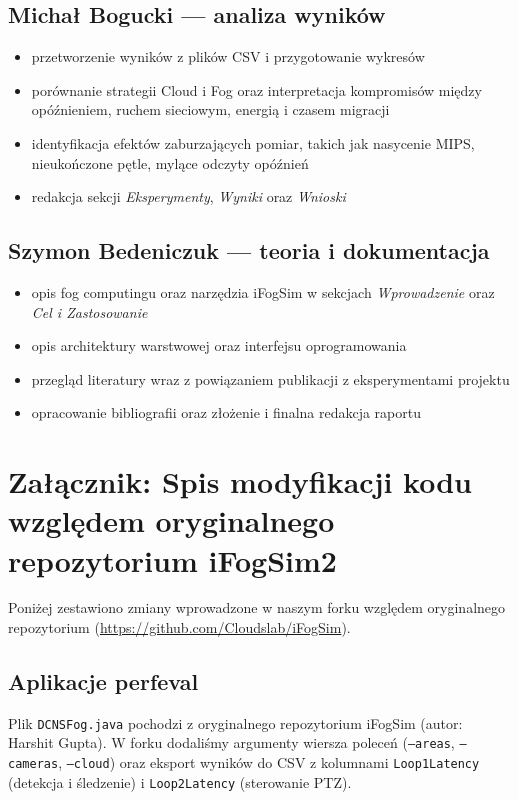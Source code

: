 \documentclass[
    oneside,            %
    left=2.5cm,         %
    right=2.5cm,        %
    top=2.5cm,          %
    bottom=3cm,         %
    bindingoffset=6mm,  %
    nohyphenation=false %
]{eiti/eiti-report}
\begin{document}
\subsection*{Michał Bogucki --- analiza wyników}
\begin{itemize}[noitemsep,topsep=2pt]
    \item przetworzenie wyników z plików CSV i przygotowanie wykresów
    \item porównanie strategii Cloud i Fog oraz interpretacja kompromisów między opóźnieniem, ruchem sieciowym, energią i czasem migracji
    \item identyfikacja efektów zaburzających pomiar, takich jak nasycenie MIPS, nieukończone pętle, mylące odczyty opóźnień
    \item redakcja sekcji \emph{Eksperymenty}, \emph{Wyniki} oraz \emph{Wnioski}
\end{itemize}

\subsection*{Szymon Bedeniczuk --- teoria i dokumentacja}
\begin{itemize}[noitemsep,topsep=2pt]
    \item opis fog computingu oraz narzędzia iFogSim w sekcjach \emph{Wprowadzenie} oraz \emph{Cel i Zastosowanie}
    \item opis architektury warstwowej oraz interfejsu oprogramowania
    \item przegląd literatury wraz z powiązaniem publikacji z eksperymentami projektu
    \item opracowanie bibliografii oraz złożenie i finalna redakcja raportu
\end{itemize}

\clearpage
\printbibliography
\pagestyle{plain}

\clearpage
\section*{Załącznik: Spis modyfikacji kodu względem oryginalnego repozytorium iFogSim2}
Poniżej zestawiono zmiany wprowadzone w naszym forku względem oryginalnego repozytorium (\url{https://github.com/Cloudslab/iFogSim}).

\subsection*{Aplikacje perfeval}
Plik \texttt{DCNSFog.java} pochodzi z oryginalnego repozytorium iFogSim (autor: Harshit Gupta). W forku dodaliśmy argumenty wiersza poleceń (\texttt{--areas}, \texttt{--cameras}, \texttt{--cloud}) oraz eksport wyników do CSV z kolumnami \texttt{Loop1Latency} (detekcja i śledzenie) i \texttt{Loop2Latency} (sterowanie PTZ).
\end{document}
